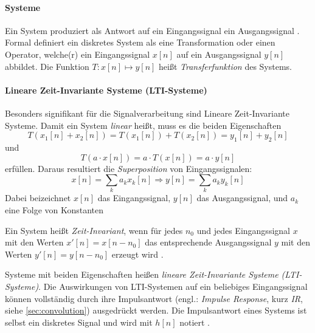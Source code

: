 \paragraph{Systeme}
Ein System produziert als Antwort auf ein Eingangssignal ein Ausgangssignal \cite[Kap. 5]{smith1997}.
Formal definiert \cite[S. 16]{oppenheim1999} ein diskretes System als eine Transformation oder einen Operator, welche(r) ein Eingangssignal $x[n]$
auf ein Ausgangssignal $y[n]$ abbildet. Die Funktion $T:x[n]\mapsto y[n]$ heißt \textit{Transferfunktion} des Systems.
\paragraph{Lineare Zeit-Invariante Systeme (LTI-Systeme)}
Besonders signifikant für die Signalverarbeitung sind Lineare Zeit-Invariante Systeme. Damit ein System \textit{linear}
heißt, muss es die beiden Eigenschaften
\begin{equation}
    T(x_1[n]+x_2[n])=T(x_1[n])+T(x_2[n])=y_1[n]+y_2[n]
\end{equation}
und 
\begin{equation}
    T(a\cdot x[n])=a\cdot T(x[n])=a\cdot y[n]
\end{equation}
erfüllen.
Daraus resultiert die \textit{Superposition} von Eingangssignalen:
\begin{equation}
    x[n]=\sum_{k}a_kx_k[n]\Rightarrow y[n]=\sum_{k}a_ky_k[n]
\end{equation}
Dabei beizeichnet $x[n]$ das Eingangssignal, $y[n]$ das Ausgangssignal, und $a_k$ eine Folge von Konstanten \cite[Kap. 2]{oppenheim1999}

Ein System heißt \textit{Zeit-Invariant}, wenn für jedes $n_0$ und jedes Eingangssignal $x$ mit den Werten
$x'[n]=x[n-n_0]$ das entsprechende Ausgangssignal $y$ mit den Werten $y'[n]=y[n-n_0]$ erzeugt wird \cite[Kap. 2]{oppenheim1999}.

Systeme mit beiden Eigenschaften heißen \textit{lineare Zeit-Invariante Systeme (LTI-Systeme)}.
Die Auswirkungen von LTI-Systemen auf ein beliebiges Eingangssignal können vollständig durch ihre Impulsantwort (engl.: \textit{Impulse Response}, kurz \textit{IR},
siehe \ref{sec:convolution}) ausgedrückt werden.
Die Impulsantwort eines Systems ist selbst ein diskretes Signal und wird mit $h[n]$ notiert \cite[Kap. 2]{oppenheim1999}.
